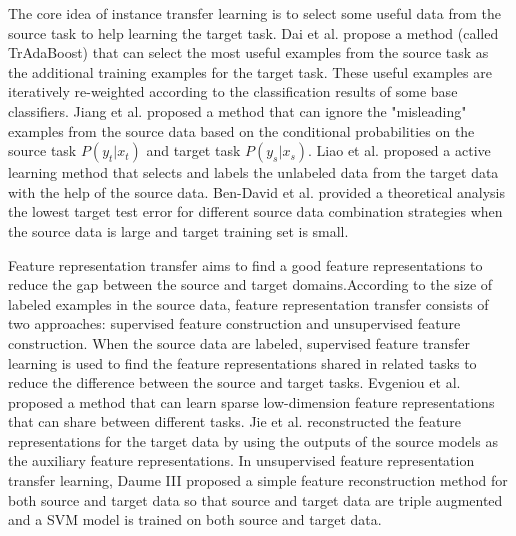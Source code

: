 The core idea of instance transfer learning is to select some useful data from the source task to help learning the target task. Dai et al. \cite{dai2007boosting} propose a method (called TrAdaBoost) that can select the most useful examples from the source task as the additional training examples for the target task. These useful examples are iteratively re-weighted according to the classification results of some base classifiers. Jiang et al. \cite{jiang2007instance} proposed a method that can ignore the "misleading" examples from the source data based on the conditional probabilities on the source task $P(y_t|x_t)$ and target task $P(y_s|x_s)$. Liao et al. \cite{liao2005logistic} proposed a active learning method that selects and labels the unlabeled data from the target data with the help of the source data. Ben-David et al. \cite{ben2010theory} provided a theoretical analysis the lowest target test error for different source data combination strategies when the source data is large and target training set is small.   

Feature representation transfer aims to find a good feature representations to reduce the gap between the source and target domains.According to the size of labeled examples in the source data, feature representation transfer consists of two approaches: supervised feature construction and unsupervised feature construction. When the source data are labeled, supervised feature transfer learning is used to find the feature representations shared in related tasks to reduce the difference between the source and target tasks. Evgeniou et al. \cite{evgeniou2007multi} proposed a method that can learn sparse low-dimension feature representations that can share between different tasks. Jie et al. \cite{jie2011multiclass} reconstructed the feature representations for the target data by using the outputs of the source models as the auxiliary feature representations. In unsupervised feature representation transfer learning, Daume III \cite{daume2009frustratingly} proposed a simple feature reconstruction method for both source and target data so that source and target data are triple augmented and a SVM model is trained on both source and target data.

